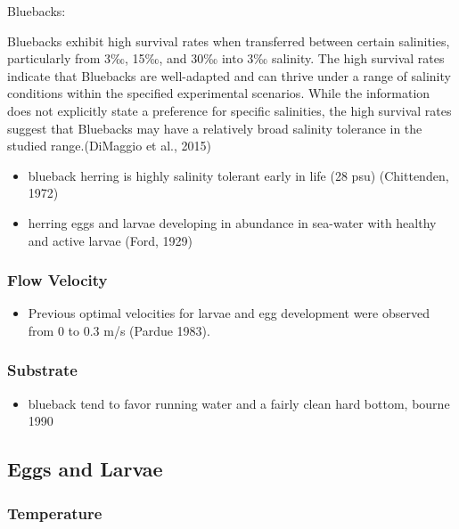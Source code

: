 \documentclass[
]{book}
\providecommand{\tightlist}{%
  \setlength{\itemsep}{0pt}\setlength{\parskip}{0pt}}
\begin{document}
Bluebacks:

Bluebacks exhibit high survival rates when transferred between certain salinities, particularly from 3‰, 15‰, and 30‰ into 3‰ salinity.
The high survival rates indicate that Bluebacks are well-adapted and can thrive under a range of salinity conditions within the specified experimental scenarios.
While the information does not explicitly state a preference for specific salinities, the high survival rates suggest that Bluebacks may have a relatively broad salinity tolerance in the studied range.(DiMaggio et al., 2015)

\begin{itemize}
\tightlist
\item
  blueback herring is highly salinity tolerant early in life (28 psu) (Chittenden, 1972)
\item
  herring eggs and larvae developing in abundance in sea-water with healthy and active larvae (Ford, 1929)
\end{itemize}

\hypertarget{flow-velocity-4}{%
\subsubsection{Flow Velocity}\label{flow-velocity-4}}

\begin{itemize}
\tightlist
\item
  Previous optimal velocities for larvae and egg development were observed from 0 to 0.3 m/s (Pardue 1983).
\end{itemize}

\hypertarget{substrate-4}{%
\subsubsection{Substrate}\label{substrate-4}}

\begin{itemize}
\tightlist
\item
  blueback tend to favor running water and a fairly clean hard bottom, bourne 1990
\end{itemize}

\hypertarget{eggs-and-larvae}{%
\subsection{Eggs and Larvae}\label{eggs-and-larvae}}

\hypertarget{temperature-5}{%
\subsubsection{Temperature}\label{temperature-5}}
\end{document}
